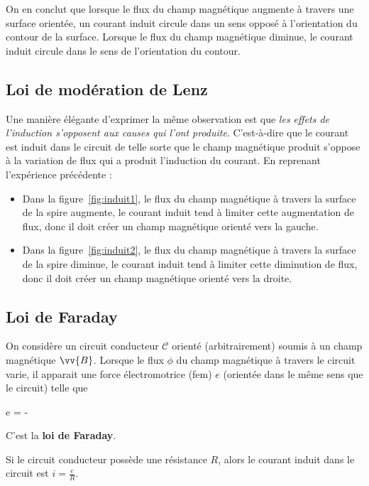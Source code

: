 \documentclass{cours}
\begin{document}
On en conclut que lorsque le flux du champ magnétique augmente à travers une surface orientée, un courant induit circule dans un sens opposé à l'orientation du contour de la surface. Lorsque le flux du champ magnétique diminue, le courant induit circule dans le sens de l'orientation du contour.

\subsection{Loi de modération de Lenz}%
\label{sub:loi_de_moderation_de_lenz}
Une manière élégante d'exprimer la même observation est que \emph{les effets de l'induction s'opposent aux causes qui l'ont produite}. C'est-à-dire que le courant est induit dans le circuit de telle sorte que le champ magnétique produit s'oppose à la variation de flux qui a produit l'induction du courant. En reprenant l'expérience précédente :
\begin{itemize}
  \item Dans la figure~\ref{fig:induit1}, le flux du champ magnétique à travers la surface de la spire augmente, le courant induit tend à limiter cette augmentation de flux, donc il doit créer un champ magnétique orienté vers la gauche.
  \item Dans la figure~\ref{fig:induit2}, le flux du champ magnétique à travers la surface de la spire diminue, le courant induit tend à limiter cette diminution de flux, donc il doit créer un champ magnétique orienté vers la droite.
\end{itemize}

\subsection{Loi de Faraday}%
\label{sub:loi_de_faraday}
On considère un circuit conducteur $\mathscr{C}$ orienté (arbitrairement) soumis à un champ magnétique $\vv{B}$. Lorsque le flux $\phi$ du champ magnétique à travers le circuit varie, il apparait une force électromotrice (fem) $e$ (orientée dans le même sens que le circuit) telle que 
\begin{eqencadre}
  e = -\dt{\phi}
\end{eqencadre}
C'est la \textbf{loi de Faraday}. 

Si le circuit conducteur possède une résistance $R$, alors le courant induit dans le circuit est $i=\frac{e}{R}$.   
\end{document}
